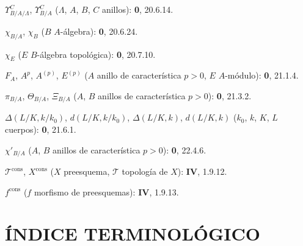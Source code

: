\clearpage
{}
$\Upsilon^C_{B/A/\Lambda}$, $\Upsilon^C_{B/A}$ ($\Lambda$, $A$, $B$, $C$ anillos): \textbf{0}, 20.6.14.\par
$\chi_{B/A}$, $\chi_B$ ($B$ $A$-álgebra): \textbf{0}, 20.6.24.\par
$\chi_E$ ($E$ $B$-álgebra topológica): \textbf{0}, 20.7.10.\par
$F_A$, $A^p$, $A^{(p)}$, $E^{(p)}$ ($A$ anillo de característica $p>0$, $E$ $A$-módulo): \textbf{0}, 21.1.4.\par
$\pi_{B/A}$, $\Theta_{B/A}$, $\Xi_{B/A}$ ($A$, $B$ anillos de característica $p>0$): \textbf{0}, 21.3.2.\par
$\Delta(L/K,k/k_0)$, $d(L/K,k/k_0)$, $\Delta(L/K,k)$, $d(L/K,k)$ ($k_0$, $k$, $K$, $L$ cuerpos): \textbf{0}, 21.6.1.\par
$\chi'_{B/A}$ ($A$, $B$ anillos de característica $p>0$): \textbf{0}, 22.4.6.\par
$\mathscr T^{\mathrm{cons}}$, $X^{\mathrm{cons}}$ ($X$ preesquema, $\mathscr T$ topología de $X$): \textbf{IV}, 1.9.12.\par
$f^{\mathrm{cons}}$ ($f$ morfismo de preesquemas): \textbf{IV}, 1.9.13.\par

\clearpage
{}
{}
\section*{ÍNDICE TERMINOLÓGICO}

